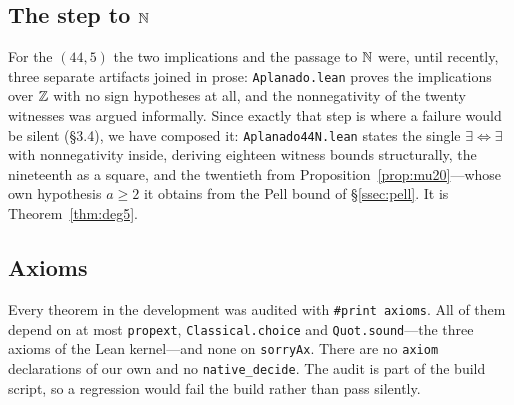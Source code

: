 \subsection{The step to \texorpdfstring{$\mathbb{N}$}{N}}

For the $(44,5)$ the two implications and the passage to $\mathbb{N}$ were, until
recently, three separate artifacts joined in prose: \texttt{Aplanado.lean}
proves the implications over $\mathbb{Z}$ with no sign hypotheses at all, and the
nonnegativity of the twenty witnesses was argued informally. Since exactly that
step is where a failure would be silent (\S3.4), we have composed it:
\texttt{Aplanado44N.lean} states the single $\exists\Leftrightarrow\exists$ with
nonnegativity inside, deriving eighteen witness bounds structurally, the
nineteenth as a square, and the twentieth from
Proposition~\ref{prop:mu20}---whose own hypothesis $a\ge2$ it obtains from the
Pell bound of \S\ref{ssec:pell}. It is Theorem~\ref{thm:deg5}.

\subsection{Axioms}

Every theorem in the development was audited with \verb|#print axioms|. All of
them depend on at most \texttt{propext}, \texttt{Classical.choice} and
\texttt{Quot.sound}---the three axioms of the Lean kernel---and none on
\texttt{sorryAx}. There are no \texttt{axiom} declarations of our own and no
\texttt{native\_decide}. The audit is part of the build script, so a regression
would fail the build rather than pass silently.
